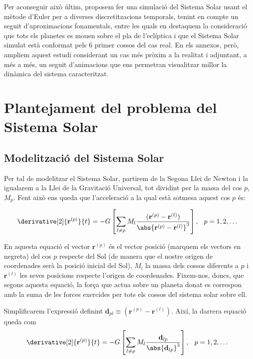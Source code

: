 \documentclass[10pt, twoside, a4paper]{article}
\begin{document}
Per aconseguir això últim, proposem fer una simulació del Sistema Solar usant el mètode d'Euler per a diverses discretitzacions temporals, tenint en compte un seguit d'aproximacions fonamentals, entre les quals en destaquem la consideració que tots els planetes es mouen sobre el pla de l'eclíptica i que el Sistema Solar simulat està conformat pels 6 primer cossos del cas real. En els annexos, però, ampliem aquest estudi considerant un cas més pròxim a la realitat i adjuntant, a més a més, un seguit d'animacions que ens permetran visualitzar millor la dinàmica del sistema caracteritzat. 

\section{Plantejament del problema del Sistema Solar}

\subsection{Modelització del Sistema Solar}
Per tal de modelitzar el Sistema Solar, partirem de la Segona Llei de Newton i la igualarem a la Llei de la Gravitació Universal, tot dividint per la massa del cos $p$, $M_p$. Fent això ens queda que l'acceleració a la qual està sotmesa aquest cos $p$ és:

\begin{equation}
    \derivative[2]{\mathbf{r}^{(p)}}{t} = - G \left[ \sum_{l \neq p} M_l \frac{(\mathbf{r}^{(p)}-\mathbf{r}^{(l)})}{\abs{\mathbf{r}^{(p)} - \mathbf{r}^{(l)}}^3}\right], \hspace{0.25cm} p = 1, 2, \ldots 
\end{equation}

En aquesta equació el vector $\mathbf{r}^{(p)}$ és el vector posició (marquem els vectors en negreta) del cos $p$ respecte del Sol (de manera que el nostre origen de coordenades serà la posició inicial del Sol), $M_l$ la massa dels cossos diferents a $p$ i $\mathbf{r}^{(l)}$ les seves posicions respecte l'origen de coordenades. Fixem-nos, doncs, que segons aquesta equació, la força que actua sobre un planeta donat es correspon amb la suma de les forces exercides per tots els cossos del sistema solar sobre ell. 

Simplificarem l'expressió definint $\mathbf{d}_{pl} \equiv (\mathbf{r}^{(p)}-\mathbf{r}^{(l)})$. Així, la darrera equació queda com
\begin{equation}
    \derivative[2]{\mathbf{r}^{(p)}}{t} = - G \left[ \sum_{l \neq p} M_l \frac{\mathbf{d}_{lp}}{\abs{\mathbf{d}_{lp}}^3}\right], \hspace{0.25cm} p = 1, 2, \ldots 
\end{equation}
\end{document}
